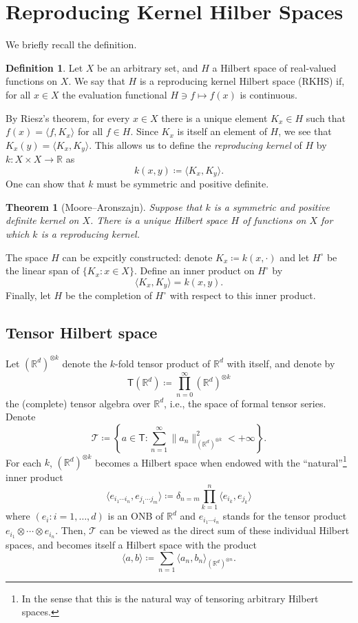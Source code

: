 \documentclass[10pt, reqno]{article}
\theoremstyle{definition}
\newtheorem{definition}{Definition}
\theoremstyle{plain}
\newtheorem{theorem}{Theorem}
\newcommand{\R}{\mathbb{R}}
\newcommand{\T}{\mathsf{T}}
\begin{document}
\section{Reproducing Kernel Hilber Spaces}
We briefly recall the definition.
\begin{definition}
	Let \(X\) be an arbitrary set, and \(H\) a Hilbert space of real-valued functions on \(X\).
	We say that \(H\) is a reproducing kernel Hilbert space (RKHS) if, for all \(x\in X\) the evaluation functional \(H\ni f\mapsto f(x)\) is
	continuous.
\end{definition}

By Riesz's theorem, for every \(x\in X\) there is a unique element \(K_x\in H\) such that \(f(x)=\langle f, K_x\rangle\) for all \(f\in H\).
Since \(K_x\) is itself an element of \(H\), we see that \(K_x(y)=\langle K_x, K_y\rangle\).
This allows us to define the \emph{reproducing kernel} of \(H\) by \(k\colon X\times X\to\R\) as
\[
	k(x,y)\coloneqq \langle K_x,K_y\rangle.
\]
One can show that \(k\) must be symmetric and positive definite.

\begin{theorem}[Moore--Aronszajn]
	\label{thm:MA}
	Suppose that \(k\) is a symmetric and positive definite kernel on \(X\). There is a unique Hilbert space \(H\) of functions on \(X\) for which \(k\)
	is a reproducing kernel.
\end{theorem}

The space \(H\) can be expcitly constructed: denote \(K_x\coloneq k(x,\cdot)\) and let \(H^\circ\) be the linear span of \(\{K_x:x\in X\}\). Define an inner product on \(H^\circ\) by
\[
	\langle K_x,K_y\rangle=k(x,y).
\]
Finally, let \(H\) be the completion of \(H^\circ\) with respect to this inner product.

\subsection{Tensor Hilbert space}
Let \((\R^d)^{\otimes k}\) denote the \(k\)-fold tensor product of \(\R^d\) with itself, and denote by
\[
	\T(\R^d)\coloneqq\prod_{n=0}^\infty( \R^d )^{\otimes k}
\]
the (complete) tensor algebra over \(\R^d\), i.e., the space of formal tensor series.
Denote
\[
	\mathscr{T}\coloneqq\left\{ a\in\T:\sum_{n=1}^{\infty}\|a_n\|^2_{(\R^d)^{\otimes k}}<+\infty\right\}.
\]
For each \(k\), \((\R^d)^{\otimes k}\) becomes a Hilbert space when endowed with the ``natural''\footnote{In the sense that this is the natural way of
tensoring arbitrary Hilbert spaces.} inner product
\[
	\langle e_{i_1\dotsm i_n},e_{j_1\dotsm j_m}\rangle\coloneqq\delta_{n=m}\prod_{k=1}^n\langle e_{i_k},e_{j_k}\rangle
\]
where \((e_{i}:i=1,\dotsc,d)\) is an ONB of \(\R^d\) and \(e_{i_1\dotsm i_n}\) stands for the tensor product \(e_{i_1}\otimes\dotsm\otimes
e_{i_n}\).
Then, \(\mathscr{T}\) can be viewed as the direct sum of these individual Hilbert spaces, and becomes itself a Hilbert space with the product
\[
	\langle a,b\rangle\coloneqq\sum_{n=1}\langle a_n,b_n\rangle_{(\R^d)^{\otimes n}}.
\]
\end{document}
